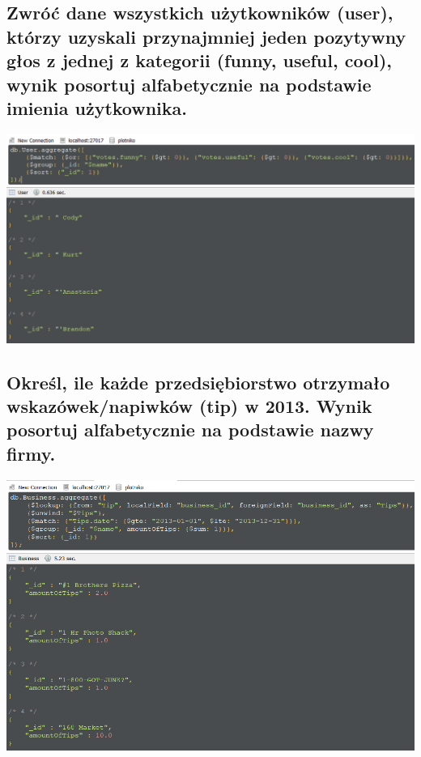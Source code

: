\documentclass[a4paper, 11pt]{article}
\begin{document}
    \newpage

    \subsection{Zwróć dane wszystkich użytkowników (user), którzy uzyskali przynajmniej jeden
    pozytywny głos z jednej z kategorii (funny, useful, cool), wynik posortuj
    alfabetycznie na podstawie imienia użytkownika.}

    


    \begin{center}
        \includegraphics[scale=0.8]{images/task1/1d.png}
    \end{center}

    \newpage


    \subsection{Określ, ile każde przedsiębiorstwo otrzymało wskazówek/napiwków (tip) w 2013.
    Wynik posortuj alfabetycznie na podstawie nazwy firmy.}

    

    \begin{center}
        \includegraphics[scale=0.8]{images/task1/1e.png}
    \end{center}
\end{document}
